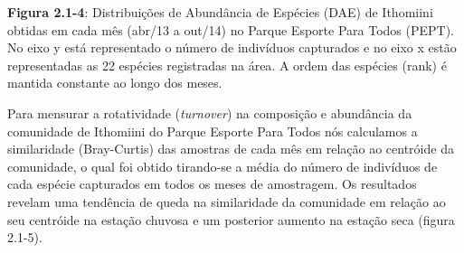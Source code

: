 \textbf{Figura 2.1-4}: Distribuições de Abundância de Espécies (DAE) de Ithomiini obtidas em cada mês (abr/13 a out/14) no Parque Esporte Para Todos (PEPT). No eixo y está representado o número de indivíduos capturados e no eixo x estão representadas as 22 espécies registradas na área. A ordem das espécies (rank) é mantida constante ao longo dos meses.

Para mensurar a rotatividade (\textit{turnover}) na composição e abundância da comunidade de Ithomiini do Parque Esporte Para Todos nós calculamos a similaridade (Bray-Curtis) das amostras de cada mês em relação ao centróide da comunidade, o qual foi obtido tirando-se a média do número de indivíduos de cada espécie capturados em todos os meses de amostragem. Os resultados revelam uma tendência de queda na similaridade da comunidade em relação ao seu centróide na estação chuvosa e um posterior aumento na estação seca (figura 2.1-5).

